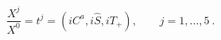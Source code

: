 \begin{equation}\label{loopvariables}
\frac{X^j}{X^{0}}=t^j=(iC^a,i\hat{S},iT_{+}), \qquad j=1, \ldots,
5\ .
\end{equation}


